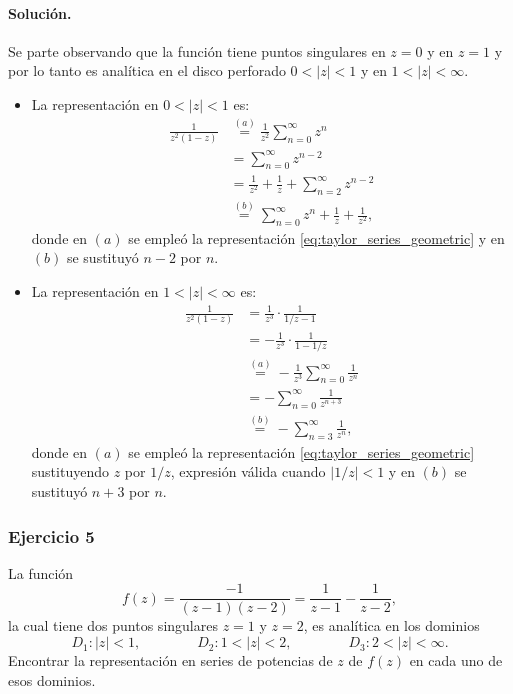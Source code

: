 \documentclass[a4paper]{report}
\begin{document}
\paragraph{Solución.} Se parte observando que la función tiene puntos singulares en \(z=0\) y en \(z=1\) y por lo tanto es analítica en el disco perforado \(0<|z|<1\) y en \(1<|z|<\infty\).
\begin{itemize}
 \item La representación en \(0<|z|<1\) es:
 \begin{align*}  
  \frac{1}{z^2(1-z)}&\overset{(a)}{=}\frac{1}{z^2}\sum_{n=0}^\infty z^n\\
   &=\sum_{n=0}^\infty z^{n-2}\\
   &=\frac{1}{z^2}+\frac{1}{z}+\sum_{n=2}^\infty z^{n-2}\\
   &\overset{(b)}{=}\sum_{n=0}^\infty z^n+\frac{1}{z}+\frac{1}{z^2},
 \end{align*}
 donde en \((a)\) se empleó la representación \ref{eq:taylor_series_geometric} y en \((b)\) se sustituyó \(n-2\) por \(n\).
 \item La representación en \(1<|z|<\infty\) es:
 \begin{align*}
  \frac{1}{z^2(1-z)}&=\frac{1}{z^3}\cdot\frac{1}{1/z-1}\\
   &=-\frac{1}{z^3}\cdot\frac{1}{1-1/z}\\
   &\overset{(a)}{=}-\frac{1}{z^3}\sum_{n=0}^\infty\frac{1}{z^n}\\
   &=-\sum_{n=0}^\infty\frac{1}{z^{n+3}}\\
   &\overset{(b)}{=}-\sum_{n=3}^\infty\frac{1}{z^n},
 \end{align*}
 donde en \((a)\) se empleó la representación \ref{eq:taylor_series_geometric} sustituyendo \(z\) por \(1/z\), expresión válida cuando \(|1/z|<1\) y en \((b)\) se sustituyó \(n+3\) por \(n\).
\end{itemize}

\subsubsection*{Ejercicio 5}

La función
\[
 f(z)=\frac{-1}{(z-1)(z-2)}=\frac{1}{z-1}-\frac{1}{z-2},
\]
la cual tiene dos puntos singulares \(z=1\) y \(z=2\), es analítica en los dominios 
\[
 D_1:|z|<1,
 \qquad\qquad
 D_2:1<|z|<2,
 \qquad\qquad
 D_3:2<|z|<\infty.
\]
Encontrar la representación en series de potencias de \(z\) de \(f(z)\) en cada uno de esos dominios.
\end{document}
